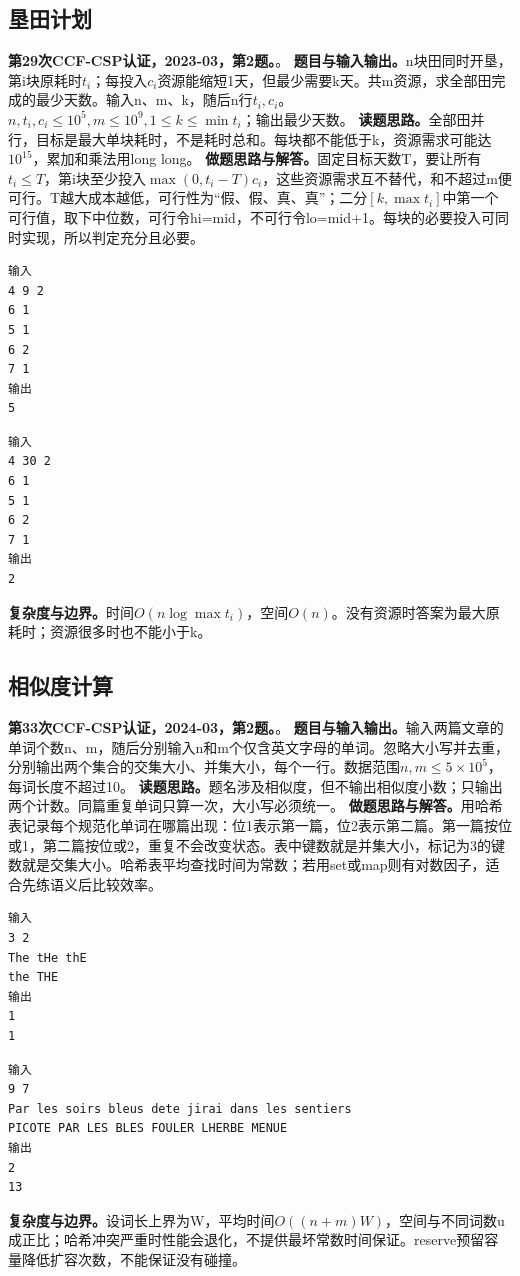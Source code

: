 \subsection{垦田计划}
\textbf{第29次CCF-CSP认证，2023-03，第2题。}。
\textbf{题目与输入输出。}n块田同时开垦，第i块原耗时$t_i$；每投入$c_i$资源能缩短1天，但最少需要k天。共m资源，求全部田完成的最少天数。输入n、m、k，随后n行$t_i,c_i$。$n,t_i,c_i\le10^5,m\le10^9,1\le k\le\min t_i$；输出最少天数。
\textbf{读题思路。}全部田并行，目标是最大单块耗时，不是耗时总和。每块都不能低于k，资源需求可能达$10^{15}$，累加和乘法用long long。
\textbf{做题思路与解答。}固定目标天数T，要让所有$t_i\le T$，第i块至少投入$\max(0,t_i-T)c_i$，这些资源需求互不替代，和不超过m便可行。T越大成本越低，可行性为“假、假、真、真”；二分$[k,\max t_i]$中第一个可行值，取下中位数，可行令hi=mid，不可行令lo=mid+1。每块的必要投入可同时实现，所以判定充分且必要。
\begin{verbatim}
输入
4 9 2
6 1
5 1
6 2
7 1
输出
5
\end{verbatim}
\begin{verbatim}
输入
4 30 2
6 1
5 1
6 2
7 1
输出
2
\end{verbatim}
\textbf{复杂度与边界。}时间$O(n\log\max t_i)$，空间$O(n)$。没有资源时答案为最大原耗时；资源很多时也不能小于k。
\subsection{相似度计算}
\textbf{第33次CCF-CSP认证，2024-03，第2题。}。
\textbf{题目与输入输出。}输入两篇文章的单词个数n、m，随后分别输入n和m个仅含英文字母的单词。忽略大小写并去重，分别输出两个集合的交集大小、并集大小，每个一行。数据范围$n,m\le5\times10^5$，每词长度不超过10。
\textbf{读题思路。}题名涉及相似度，但不输出相似度小数；只输出两个计数。同篇重复单词只算一次，大小写必须统一。
\textbf{做题思路与解答。}用哈希表记录每个规范化单词在哪篇出现：位1表示第一篇，位2表示第二篇。第一篇按位或1，第二篇按位或2，重复不会改变状态。表中键数就是并集大小，标记为3的键数就是交集大小。哈希表平均查找时间为常数；若用set或map则有对数因子，适合先练语义后比较效率。
\begin{verbatim}
输入
3 2
The tHe thE
the THE
输出
1
1
\end{verbatim}
\begin{verbatim}
输入
9 7
Par les soirs bleus dete jirai dans les sentiers
PICOTE PAR LES BLES FOULER LHERBE MENUE
输出
2
13
\end{verbatim}
\textbf{复杂度与边界。}设词长上界为W，平均时间$O((n+m)W)$，空间与不同词数u成正比；哈希冲突严重时性能会退化，不提供最坏常数时间保证。reserve预留容量降低扩容次数，不能保证没有碰撞。
